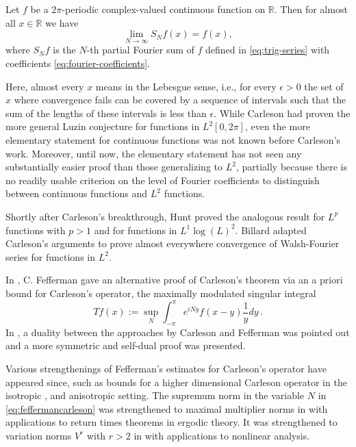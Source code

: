 \begin{theorem}
    \label{classical-carleson}
    \leanok
    Let $f$ be a $2\pi$-periodic complex-valued continuous function on $\mathbb{R}$.
    Then for almost all $x \in \mathbb{R}$ we have
    \begin{equation}\label{eq:fourier-limit}
      \lim_{N\to\infty}S_N f(x) = f(x),
    \end{equation}
    where $S_N f$ is the $N$-th partial Fourier sum of $f$ defined in \eqref{eq:trig-series}
    with coefficients \eqref{eq:fourier-coefficients}.
\end{theorem}

Here, almost every $x$ means in the Lebesgue sense, i.e., for every $\epsilon>0$ the set of $x$ where convergence fails can be covered by a sequence of intervals
such that the sum of the lengths of these
intervals is less than $\epsilon$. While Carleson had proven the more general Luzin conjecture for functions in $L^2[0,2\pi]$, even the more elementary statement for continuous functions was not known before Carleson's work.
Moreover, until now, the elementary statement has not seen any substantially easier proof than those generalizing to $L^2$,
partially because there is no readily usable criterion on the level of
Fourier coefficients to distinguish between continuous functions and $L^2$ functions.


Shortly after Carleson's breakthrough, Hunt \cite{MR238019} proved the analogous result for $L^p$ functions
with $p>1$ and for functions in $L^1\log(L)^2$.
Billard \cite{MR217510} adapted Carleson's arguments to prove almost everywhere convergence of Walsh-Fourier series
for functions in $L^2$.


In \cite{fefferman}, C. Fefferman gave an alternative proof of Carleson's theorem via an a priori
bound for Carleson's operator, the maximally modulated singular integral
\begin{equation}\label{eq:feffermancarleson}
    Tf(x):=\sup_{N} \int_{-\pi}^\pi e^{iNy}f(x-y)\frac 1y {dy}\, .
\end{equation}
In \cite{lacey-thiele}, a duality
between the approaches by Carleson and Fefferman was pointed out and a more symmetric and self-dual proof was presented.


Various strengthenings of Fefferman's estimates for Carleson's operator have appeared since, such as bounds for a higher dimensional Carleson operator in the isotropic
\cite{MR336222}, \cite{MR2007237} and anisotropic \cite{MR4014801} setting.
The supremum norm in the variable $N$ in \eqref{eq:feffermancarleson} was strengthened
to maximal multiplier norms in \cite{MR2420509} with applications to return times theorems in ergodic theory.
It was strengthened to variation norms $V^r$ with $r>2$ in \cite{MR2881301} with applications to nonlinear analysis.

